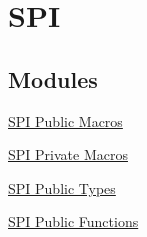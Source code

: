 \hypertarget{group___s_p_i}{\section{\-S\-P\-I}
\label{group___s_p_i}
}
\subsection*{\-Modules}
\begin{DoxyCompactItemize}
\item 
\hyperlink{group___s_p_i___public___macros}{\-S\-P\-I Public Macros}
\item 
\hyperlink{group___s_p_i___private___macros}{\-S\-P\-I Private Macros}
\item 
\hyperlink{group___s_p_i___public___types}{\-S\-P\-I Public Types}
\item 
\hyperlink{group___s_p_i___public___functions}{\-S\-P\-I Public Functions}
\end{DoxyCompactItemize}
